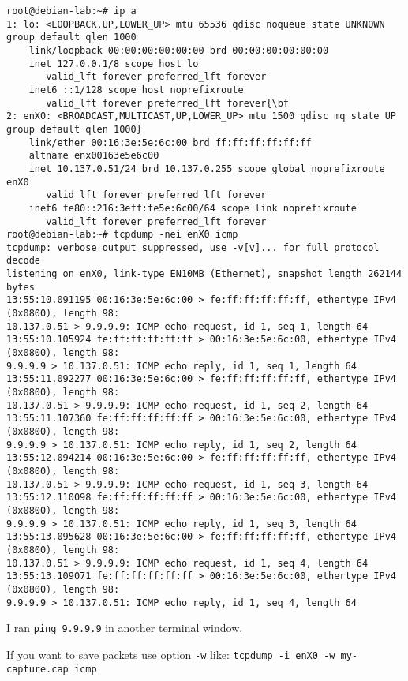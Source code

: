\documentclass[a4paper,11pt,notitlepage]{report}
\begin{document}
\begin{verbatim}
root@debian-lab:~# ip a
1: lo: <LOOPBACK,UP,LOWER_UP> mtu 65536 qdisc noqueue state UNKNOWN group default qlen 1000
    link/loopback 00:00:00:00:00:00 brd 00:00:00:00:00:00
    inet 127.0.0.1/8 scope host lo
       valid_lft forever preferred_lft forever
    inet6 ::1/128 scope host noprefixroute
       valid_lft forever preferred_lft forever{\bf
2: enX0: <BROADCAST,MULTICAST,UP,LOWER_UP> mtu 1500 qdisc mq state UP group default qlen 1000}
    link/ether 00:16:3e:5e:6c:00 brd ff:ff:ff:ff:ff:ff
    altname enx00163e5e6c00
    inet 10.137.0.51/24 brd 10.137.0.255 scope global noprefixroute enX0
       valid_lft forever preferred_lft forever
    inet6 fe80::216:3eff:fe5e:6c00/64 scope link noprefixroute
       valid_lft forever preferred_lft forever
root@debian-lab:~# tcpdump -nei enX0 icmp
tcpdump: verbose output suppressed, use -v[v]... for full protocol decode
listening on enX0, link-type EN10MB (Ethernet), snapshot length 262144 bytes
13:55:10.091195 00:16:3e:5e:6c:00 > fe:ff:ff:ff:ff:ff, ethertype IPv4 (0x0800), length 98:
10.137.0.51 > 9.9.9.9: ICMP echo request, id 1, seq 1, length 64
13:55:10.105924 fe:ff:ff:ff:ff:ff > 00:16:3e:5e:6c:00, ethertype IPv4 (0x0800), length 98:
9.9.9.9 > 10.137.0.51: ICMP echo reply, id 1, seq 1, length 64
13:55:11.092277 00:16:3e:5e:6c:00 > fe:ff:ff:ff:ff:ff, ethertype IPv4 (0x0800), length 98:
10.137.0.51 > 9.9.9.9: ICMP echo request, id 1, seq 2, length 64
13:55:11.107360 fe:ff:ff:ff:ff:ff > 00:16:3e:5e:6c:00, ethertype IPv4 (0x0800), length 98:
9.9.9.9 > 10.137.0.51: ICMP echo reply, id 1, seq 2, length 64
13:55:12.094214 00:16:3e:5e:6c:00 > fe:ff:ff:ff:ff:ff, ethertype IPv4 (0x0800), length 98:
10.137.0.51 > 9.9.9.9: ICMP echo request, id 1, seq 3, length 64
13:55:12.110098 fe:ff:ff:ff:ff:ff > 00:16:3e:5e:6c:00, ethertype IPv4 (0x0800), length 98:
9.9.9.9 > 10.137.0.51: ICMP echo reply, id 1, seq 3, length 64
13:55:13.095628 00:16:3e:5e:6c:00 > fe:ff:ff:ff:ff:ff, ethertype IPv4 (0x0800), length 98:
10.137.0.51 > 9.9.9.9: ICMP echo request, id 1, seq 4, length 64
13:55:13.109071 fe:ff:ff:ff:ff:ff > 00:16:3e:5e:6c:00, ethertype IPv4 (0x0800), length 98:
9.9.9.9 > 10.137.0.51: ICMP echo reply, id 1, seq 4, length 64
\end{verbatim}

I ran \verb+ping 9.9.9.9+ in another terminal window.

If you want to save packets use option \verb+-w+ like: \verb+tcpdump -i enX0 -w my-capture.cap icmp+
\end{document}
